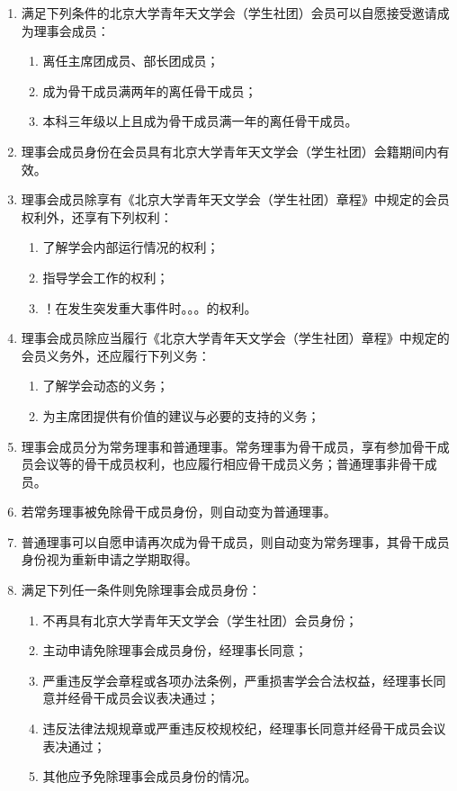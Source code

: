 \begin{enumerate}[resume]
    \item 满足下列条件的北京大学青年天文学会（学生社团）会员可以自愿接受邀请成为理事会成员：\label{item:council}
    \begin{enumerate}
        \item 离任主席团成员、部长团成员；
        \item 成为骨干成员满两年的离任骨干成员；
        \item 本科三年级以上且成为骨干成员满一年的离任骨干成员。
    \end{enumerate}

    \item 理事会成员身份在会员具有北京大学青年天文学会（学生社团）会籍期间内有效。
    
    \item 理事会成员除享有《北京大学青年天文学会（学生社团）章程》中规定的会员权利外，还享有下列权利：
    \begin{enumerate}
        \item 了解学会内部运行情况的权利；
        \item 指导学会工作的权利；
        \item ！在发生突发重大事件时。。。的权利。
    \end{enumerate}

    \item 理事会成员除应当履行《北京大学青年天文学会（学生社团）章程》中规定的会员义务外，还应履行下列义务：
    \begin{enumerate}
        \item 了解学会动态的义务；
        \item 为主席团提供有价值的建议与必要的支持的义务；
    \end{enumerate}

    \item 理事会成员分为常务理事和普通理事。常务理事为骨干成员，享有参加骨干成员会议等的骨干成员权利，也应履行相应骨干成员义务；普通理事非骨干成员。
    
    \item 若常务理事被免除骨干成员身份，则自动变为普通理事。
    
    \item 普通理事可以自愿申请再次成为骨干成员，则自动变为常务理事，其骨干成员身份视为重新申请之学期取得。
    
    \item 满足下列任一条件则免除理事会成员身份：
    \begin{enumerate}
        \item 不再具有北京大学青年天文学会（学生社团）会员身份；
        \item 主动申请免除理事会成员身份，经理事长同意；
        \item 严重违反学会章程或各项办法条例，严重损害学会合法权益，经理事长同意并经骨干成员会议表决通过；
        \item 违反法律法规规章或严重违反校规校纪，经理事长同意并经骨干成员会议表决通过；
        \item 其他应予免除理事会成员身份的情况。
    \end{enumerate}

\end{enumerate}


